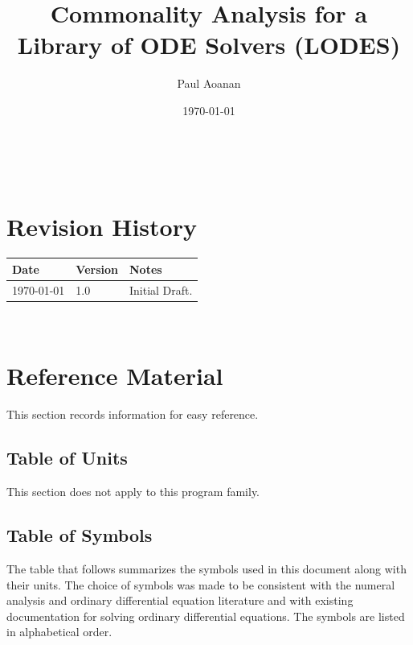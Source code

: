 \documentclass[12pt]{article}
\newcommand{\famname}{LODES} %
\newcommand{\famdesc}{Library of ODE Solvers}
\begin{document}
\title{Commonality Analysis for a \famdesc{} (\famname{})} 
\author{Paul Aoanan}
\date{\today}

\maketitle

~\newpage


\section{Revision History}

\begin{tabularx}{\textwidth}{p{3cm}p{2cm}X}
\toprule {\bf Date} & {\bf Version} & {\bf Notes}\\
\midrule
\today & 1.0 & Initial Draft.\\
\bottomrule
\end{tabularx}

~\newpage
	
\section{Reference Material}

This section records information for easy reference.

\subsection{Table of Units}

This section does not apply to this program family.

\subsection{Table of Symbols}

The table that follows summarizes the symbols used in this document along with
their units.  The choice of symbols was made to be consistent with the numeral analysis
and ordinary differential equation literature and with existing documentation
for solving ordinary differential equations.  The symbols are listed in alphabetical order.
\end{document}

